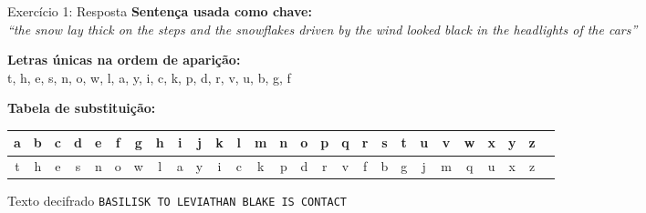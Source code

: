 \begin{frame}{Exercício 1:  Resposta}
\textbf{Sentença usada como chave:} \\
\emph{``the snow lay thick on the steps and the snowflakes driven by the wind looked black in the headlights of the cars''}

\medskip
\textbf{Letras únicas na ordem de aparição:} \\
t, h, e, s, n, o, w, l, a, y, i, c, k, p, d, r, v, u, b, g, f

\medskip
\textbf{Tabela de substituição:}


\footnotesize
\begin{tabular}{ccccccccccccccccccccccccccc}
 a & b & c & d & e & f & g & h & i & j & k & l & m & n & o & p & q & r & s & t & u & v & w & x & y & z \\
\hline
t & h & e & s & n & o & w & l & a & y & i & c & k & p & d & r & v & f & b & g & j & m & q & u & x & z \\
\end{tabular}


\medskip
\begin{block}{Texto decifrado}
\centering
\texttt{BASILISK TO LEVIATHAN BLAKE IS CONTACT}
\end{block}
\end{frame}
